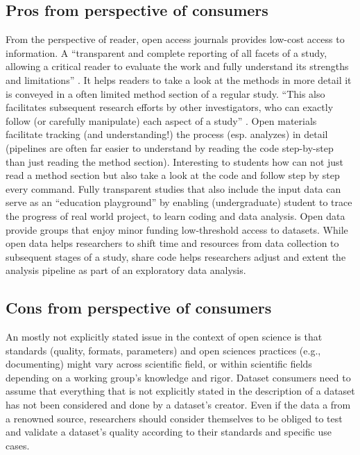 \subsection{Pros from perspective of consumers}


%
From the perspective of reader, open access journals provides low-cost access to
information.
A ``transparent and complete reporting of all facets of a study, allowing a
critical reader to evaluate the work and fully understand its strengths and
limitations'' \citep{nichols2017best}.
%
It helps readers to take a look at the methods in more detail it is conveyed in
a often limited method section of a regular study.
%
``This also facilitates subsequent research efforts by other investigators, who
can exactly follow (or carefully manipulate) each aspect of a study''
\citep{nichols2017best}.
%
Open materials facilitate tracking (and understanding!) the process (esp.
analyzes) in detail (pipelines are often far easier to understand by reading the
code step-by-step than just reading the method section).
%
Interesting to students how can not just read a method section but also take a
look at the code and follow step by step every command.
%
Fully transparent studies that also include the input data can serve as an
``education playground'' by enabling (undergraduate) student to trace the
progress of real world project, to learn coding and data analysis.
%
Open data provide groups that enjoy minor funding low-threshold access to
datasets.
%
While open data helps researchers to shift time and resources from data
collection to subsequent stages of a study, share code helps researchers adjust
and extent the analysis pipeline as part of an exploratory data analysis.


\subsection{Cons from perspective of consumers}

An mostly not explicitly stated issue in the context of open science is that
standards (quality, formats, parameters) and open sciences practices (e.g.,
documenting) might vary across scientific field, or within scientific fields
depending on a working group's knowledge and rigor.
Dataset consumers need to assume that everything that is not explicitly stated
in the description of a dataset has not been considered and done by a dataset's
creator.
Even if the data a from a renowned source, researchers should consider
themselves to be obliged to test and validate a dataset's quality according to
their standards and specific use cases.


